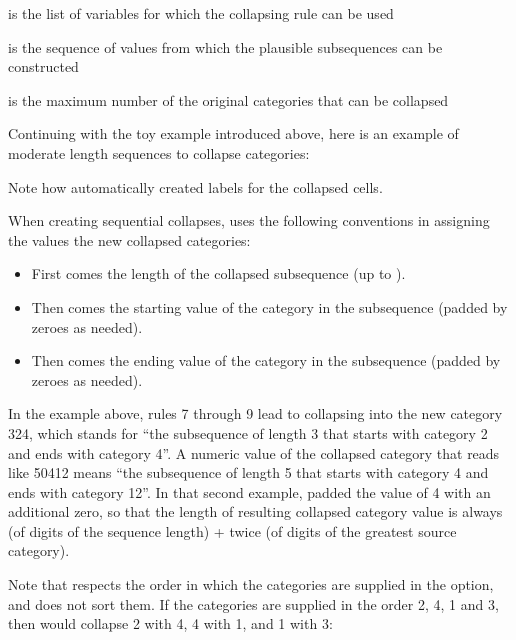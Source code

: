 \hangpara
{} is the list of variables for which the collapsing rule can be used

\hangpara
{} is the sequence of values from which the plausible subsequences can be constructed

\hangpara
{} is the maximum number of the original categories that can be collapsed

Continuing with the toy example introduced above, here is an example of moderate length sequences to collapse categories:

\begin{stlog}
\nullskip
\end{stlog}

Note how  automatically created labels for the collapsed cells.

When creating sequential collapses,  uses the following conventions
in assigning the values the new collapsed categories:
\begin{itemize}
    \item First comes the length of the collapsed subsequence (up to ).
    \item Then comes the starting value of the category in the subsequence (padded by zeroes as needed).
    \item Then comes the ending value of the category in the subsequence (padded by zeroes as needed).
\end{itemize}

In the example above, rules 7 through 9 lead to collapsing into the new category 324,
which stands for ``the subsequence of length 3 that starts with category 2 and ends with category 4''.
A numeric value of the collapsed category that reads like 50412 means
``the subsequence of length 5 that starts with category 4 and ends with category 12''.
In that second example,  padded the value of 4 with an additional zero,
so that the length of resulting collapsed category value is always (\stnum of digits of the sequence length) +
twice (\stnum of digits of the greatest source category).

Note that  respects the order in which the categories are
supplied in the  option, and does not sort them. If the categories are supplied
in the order 2, 4, 1 and 3, then  would collapse 2 with 4, 4 with 1,
and 1 with 3:

